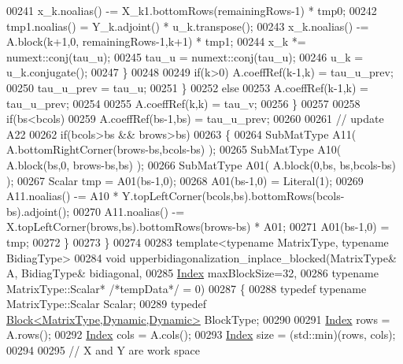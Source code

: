 \begin{DoxyCode}
00241         x\_k.noalias()  -= X\_k1.bottomRows(remainingRows-1) * tmp0;
00242         tmp1.noalias()  = Y\_k.adjoint() * u\_k.transpose();
00243         x\_k.noalias()  -= A.block(k+1,0, remainingRows-1,k+1) * tmp1;
00244         x\_k *= numext::conj(tau\_u);
00245         tau\_u = numext::conj(tau\_u);
00246         u\_k = u\_k.conjugate();
00247       \}
00248 
00249       \textcolor{keywordflow}{if}(k>0) A.coeffRef(k-1,k) = tau\_u\_prev;
00250       tau\_u\_prev = tau\_u;
00251     \}
00252     \textcolor{keywordflow}{else}
00253       A.coeffRef(k-1,k) = tau\_u\_prev;
00254 
00255     A.coeffRef(k,k) = tau\_v;
00256   \}
00257   
00258   \textcolor{keywordflow}{if}(bs<bcols)
00259     A.coeffRef(bs-1,bs) = tau\_u\_prev;
00260 
00261   \textcolor{comment}{// update A22}
00262   \textcolor{keywordflow}{if}(bcols>bs && brows>bs)
00263   \{
00264     SubMatType A11( A.bottomRightCorner(brows-bs,bcols-bs) );
00265     SubMatType A10( A.block(bs,0, brows-bs,bs) );
00266     SubMatType A01( A.block(0,bs, bs,bcols-bs) );
00267     Scalar tmp = A01(bs-1,0);
00268     A01(bs-1,0) = Literal(1);
00269     A11.noalias() -= A10 * Y.topLeftCorner(bcols,bs).bottomRows(bcols-bs).adjoint();
00270     A11.noalias() -= X.topLeftCorner(brows,bs).bottomRows(brows-bs) * A01;
00271     A01(bs-1,0) = tmp;
00272   \}
00273 \}
00274 
00283 \textcolor{keyword}{template}<\textcolor{keyword}{typename} MatrixType, \textcolor{keyword}{typename} B\textcolor{keywordtype}{id}iagType>
00284 \textcolor{keywordtype}{void} upperbidiagonalization\_inplace\_blocked(MatrixType& A, BidiagType& bidiagonal,
00285                                             \hyperlink{class_eigen_1_1internal_1_1_upper_bidiagonalization_adcb14f3919a3dcc9977ba6b8105087fe}{Index} maxBlockSize=32,
00286                                             \textcolor{keyword}{typename} MatrixType::Scalar* \textcolor{comment}{/*tempData*/} = 0)
00287 \{
00288   \textcolor{keyword}{typedef} \textcolor{keyword}{typename} MatrixType::Scalar Scalar;
00289   \textcolor{keyword}{typedef} \hyperlink{group___core___module_class_eigen_1_1_block}{Block<MatrixType,Dynamic,Dynamic>} BlockType;
00290 
00291   \hyperlink{class_eigen_1_1internal_1_1_upper_bidiagonalization_adcb14f3919a3dcc9977ba6b8105087fe}{Index} rows = A.rows();
00292   \hyperlink{class_eigen_1_1internal_1_1_upper_bidiagonalization_adcb14f3919a3dcc9977ba6b8105087fe}{Index} cols = A.cols();
00293   \hyperlink{class_eigen_1_1internal_1_1_upper_bidiagonalization_adcb14f3919a3dcc9977ba6b8105087fe}{Index} size = (std::min)(rows, cols);
00294 
00295   \textcolor{comment}{// X and Y are work space}

\end{DoxyCode}
